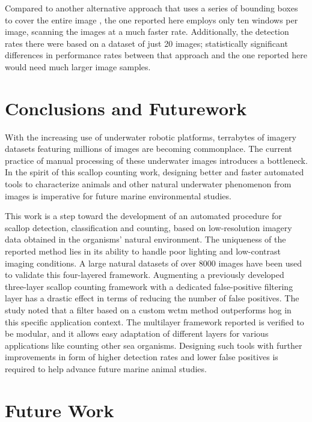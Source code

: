 \documentclass {udthesis}
\begin{document}
Compared to another alternative approach that uses a series of bounding boxes to cover the entire image \cite{guomundsson}, the one reported here employs only ten windows per image, scanning the images at a much faster rate.   
Additionally, the detection rates there \cite{guomundsson} were based on a dataset of just 20 images; statistically significant differences in performance rates between that approach and the one reported here would need much larger image samples.

\section{Conclusions and Futurework}

With the increasing use of underwater robotic platforms, terrabytes of imagery datasets featuring millions of images are becoming commonplace. 
The current practice of manual processing of these underwater images introduces a bottleneck. 
In the spirit of this scallop counting work, designing better and faster automated tools  to characterize animals and other natural underwater phenomenon from images is imperative for future marine environmental studies.

This work is a step toward
the development of an automated procedure for scallop detection, classification
and counting, based on low-resolution imagery data obtained in the organisms' natural environment.
The uniqueness of the reported method lies in its ability to handle poor lighting and low-contrast imaging conditions.
A large natural datasets of over 8000 images have been used to validate this four-layered framework.
Augmenting a previously developed three-layer scallop counting framework with a dedicated false-positive filtering layer has a drastic effect in terms of reducing the number of false positives.
The study noted that a filter based on a custom \gls{wctm} method outperforms \gls{hog} in  this specific application context. 
The multilayer framework reported is verified to be modular, and it allows easy adaptation of different layers for various applications like counting other sea organisms. 
Designing such tools with further improvements in form of higher detection rates and lower false positives is required to help advance future marine animal studies.

\section{Future Work}
\end{document}
